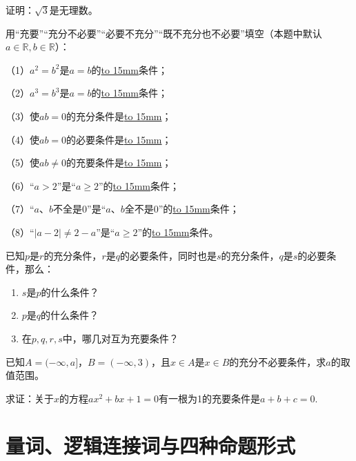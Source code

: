 \documentclass[lang=cn,math=cm,chinesefont=nofont,11pt,scheme=chinese,onecol]{elegantbook}
\begin{document}
\begin{exercise}\label{202407081520}
  证明：$\sqrt{3}$是无理数。
\end{exercise}

\begin{exercise}\label{BJ4Z_Algebra1_P28.2}
  用“充要”“充分不必要”“必要不充分”“既不充分也不必要”填空（本题中默认$a\in\mathbb{R},b\in\mathbb{R}$）：

  （1）$a^2=b^2$是$a=b$的\underline{\hbox to 15mm{}}条件；

  （2）$a^3=b^3$是$a=b$的\underline{\hbox to 15mm{}}条件；

  （3）使$ab=0$的充分条件是\underline{\hbox to 15mm{}}；

  （4）使$ab=0$的必要条件是\underline{\hbox to 15mm{}}；

  （5）使$ab\neq 0$的充要条件是\underline{\hbox to 15mm{}}；

  （6）“$a>2$”是“$a\geqslant2$”的\underline{\hbox to 15mm{}}条件；

  （7）“$a、b$不全是0”是“$a、b$全不是0”的\underline{\hbox to 15mm{}}条件；

  （8）“$\vert a-2\vert\neq2-a$”是“$a\geqslant2$”的\underline{\hbox to 15mm{}}条件。
\end{exercise}

\begin{exercise}\label{2017_XJ_bx1_P23.8}
  已知$p$是$r$的充分条件，$r$是$q$的必要条件，同时也是$s$的充分条件，$q$是$s$的必要条件，那么：
\end{exercise}

\begin{enumerate}
  \item $s$是$p$的什么条件？
  \item $p$是$q$的什么条件？
  \item 在$p,q,r,s$中，哪几对互为充要条件？
\end{enumerate}

\begin{exercise}\label{2017_RJB_bx1_P36.B5}
  已知$A=(-\infty,a]$，$B=(-\infty,3)$，且$x\in A$是$x\in B$的充分不必要条件，求$a$的取值范围。
\end{exercise}

\begin{exercise}\label{zhw2000_g1_P51.78}
  求证：关于$x$的方程$ax^2+bx+1=0$有一根为1的充要条件是$a+b+c=0$.
\end{exercise}

\section{量词、逻辑连接词与四种命题形式}
\end{document}

